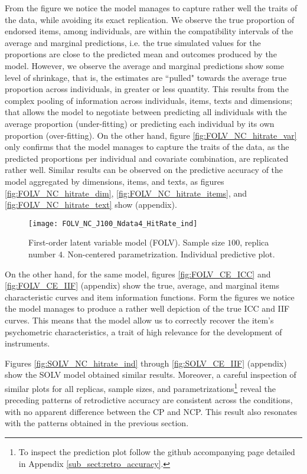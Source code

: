 From the figure we notice the model manages to capture rather well the traits of the data, while avoiding its exact replication. We observe the true proportion of endorsed items, among individuals, are within the compatibility intervals of the average and marginal predictions, i.e. the true simulated values for the proportions are close to the predicted mean and outcomes produced by the model. However, we observe the average and marginal predictions show some level of shrinkage, that is, the estimates are ``pulled" towards the average true proportion across individuals, in greater or less quantity. This results from the complex pooling of information across individuals, items, texts and dimensions; that allows the model to negotiate between predicting all individuals with the average proportion (under-fitting) or predicting each individual by its own proportion (over-fitting). On the other hand, figure \ref{fig:FOLV_NC_hitrate_var} only confirms that the model manages to capture the traits of the data, as the predicted proportions per individual and covariate combination, are replicated rather well. Similar results can be observed on the predictive accuracy of the model aggregated by dimensions, items, and texts, as figures \ref{fig:FOLV_NC_hitrate_dim}, \ref{fig:FOLV_NC_hitrate_items}, and \ref{fig:FOLV_NC_hitrate_text} show (appendix).
%
\begin{figure}[H]
	\centering
	\texttt{[image: FOLV\_NC\_J100\_Ndata4\_HitRate\_ind]}
	\caption[First-order latent variable model (FOLV). Sample size $100$, replica number $4$. Non-centered parametrization. Individual predictive plot.]%
	{First-order latent variable model (FOLV). Sample size $100$, replica number $4$. Non-centered parametrization. Individual predictive plot.}
	\label{fig:FOLV_NC_hitrate_ind}
\end{figure}

On the other hand, for the same model, figures \ref{fig:FOLV_CE_ICC} and \ref{fig:FOLV_CE_IIF} (appendix) show the true, average, and marginal items characteristic curves and item information functions. Form the figures we notice the model manages to produce a rather well depiction of the true ICC and IIF curves. This means that the model allow us to correctly recover the item's psychometric characteristics, a trait of high relevance for the development of instruments.

Figures \ref{fig:SOLV_NC_hitrate_ind} through \ref{fig:SOLV_CE_IIF} (appendix) show the SOLV model obtained similar results. Moreover, a careful inspection of similar plots for all replicas, sample sizes, and parametrizations\footnote{To inspect the prediction plot follow the github accompanying page detailed in Appendix \ref{sub_sect:retro_accuracy}.} reveal the preceding patterns of retrodictive accuracy are consistent across the conditions, with no apparent difference between the CP and NCP. This result also resonates with the patterns obtained in the previous section.

